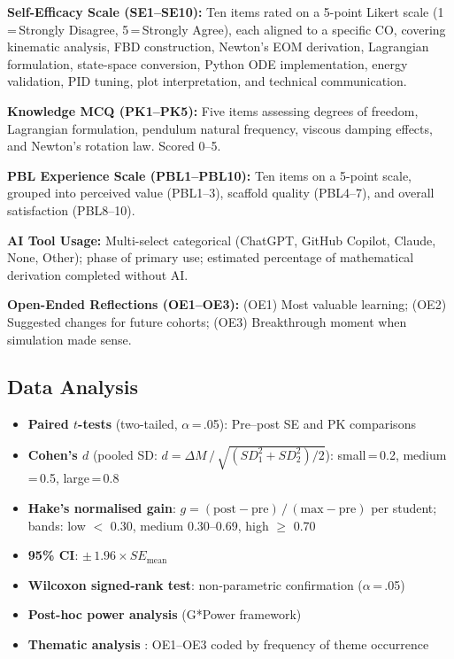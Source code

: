 \documentclass[12pt, a4paper]{article}
\begin{document}
\textbf{Self-Efficacy Scale (SE1--SE10):} Ten items rated on a
5-point Likert scale (1\,=\,Strongly Disagree, 5\,=\,Strongly
Agree), each aligned to a specific CO, covering kinematic
analysis, FBD construction, Newton's EOM derivation, Lagrangian
formulation, state-space conversion, Python ODE implementation,
energy validation, PID tuning, plot interpretation, and technical
communication.

\textbf{Knowledge MCQ (PK1--PK5):} Five items assessing degrees
of freedom, Lagrangian formulation, pendulum natural frequency,
viscous damping effects, and Newton's rotation law. Scored 0--5.

\textbf{PBL Experience Scale (PBL1--PBL10):} Ten items on a
5-point scale, grouped into perceived value (PBL1--3), scaffold
quality (PBL4--7), and overall satisfaction (PBL8--10).

\textbf{AI Tool Usage:} Multi-select categorical (ChatGPT, GitHub
Copilot, Claude, None, Other); phase of primary use; estimated
percentage of mathematical derivation completed without AI.

\textbf{Open-Ended Reflections (OE1--OE3):} (OE1) Most valuable
learning; (OE2) Suggested changes for future cohorts; (OE3)
Breakthrough moment when simulation made sense.

\subsection{Data Analysis}

\begin{itemize}[noitemsep]
  \item \textbf{Paired $t$-tests} (two-tailed, $\alpha$\,=\,.05):
    Pre--post SE and PK comparisons

  \item \textbf{Cohen's $d$} (pooled SD:
    $d = \Delta M \,/\, \sqrt{(SD_1^2 + SD_2^2)/2}$):
    small\,=\,0.2, medium\,=\,0.5, large\,=\,0.8
    \citep{cohen1988statistical}

  \item \textbf{Hake's normalised gain}:
    $g = (\text{post}-\text{pre})\,/\,(\text{max}-\text{pre})$ per
    student; bands: low $<$ 0.30, medium 0.30--0.69, high
    $\geq$ 0.70 \citep{hake1998interactive}

  \item \textbf{95\% CI}: $\pm\,1.96 \times SE_{\text{mean}}$

  \item \textbf{Wilcoxon signed-rank test}: non-parametric
    confirmation ($\alpha$\,=\,.05)

  \item \textbf{Post-hoc power analysis} (G*Power framework)

  \item \textbf{Thematic analysis} \citep{thomas2008methods}:
    OE1--OE3 coded by frequency of theme occurrence
\end{itemize}
\end{document}
